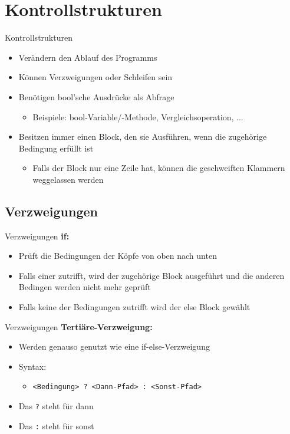 \section{Kontrollstrukturen}
\begin{frame}{Kontrollstrukturen}
	\begin{itemize}
		\item Verändern den Ablauf des Programms
		\item Können Verzweigungen oder Schleifen sein
		\item Benötigen bool'sche Ausdrücke als Abfrage
		\begin{itemize}
			\item Beispiele: bool-Variable/-Methode, Vergleichsoperation, ...
		\end{itemize}
		\item Besitzen immer einen Block, den sie Ausführen, wenn die zugehörige Bedingung erfüllt ist
		\begin{itemize}
			\item Falls der Block nur eine Zeile hat, können die geschweiften Klammern weggelassen werden
		\end{itemize}
	\end{itemize}
\end{frame}

\subsection{Verzweigungen}
\begin{frame}{Verzweigungen}
	\textbf{if:}\\
	\begin{itemize}
		\item Prüft die Bedingungen der Köpfe von oben nach unten
		\item Falls einer zutrifft, wird der zugehörige Block ausgeführt und die anderen Bedingen werden nicht mehr geprüft
		\item Falls keine der Bedingungen zutrifft wird der else Block gewählt
	\end{itemize}
	
\end{frame}

\begin{frame}{Verzweigungen}
	\textbf{Tertiäre-Verzweigung:}\\
	\begin{itemize}
		\item Werden genauso genutzt wie eine if-else-Verzweigung
		\item Syntax:
		\begin{itemize}
			\item \alert{\texttt{<Bedingung> ? <Dann-Pfad> : <Sonst-Pfad>}}
		\end{itemize}
		\item Das \alert{\texttt{?}} steht für \alert{dann}
		\item Das \alert{\texttt{:}} steht für \alert{sonst}
	\end{itemize}		
	
\end{frame}

